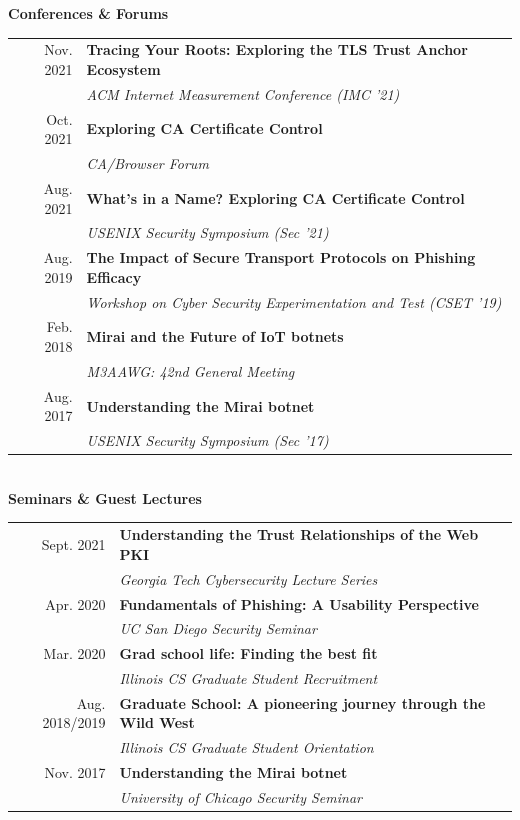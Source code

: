 \documentclass[10pt,singlecolumn]{article} %
\begin{document}
\textbf{Conferences \& Forums}\\

\begin{tabular}{rl}
Nov. 2021 & \textbf{Tracing Your Roots: Exploring the TLS Trust Anchor Ecosystem}\\
& \emph{ACM Internet Measurement Conference (IMC '21)} \\
Oct. 2021 & \textbf{Exploring CA Certificate Control}\\
& \emph{CA/Browser Forum} \\
Aug. 2021 & \textbf{What's in a Name? Exploring CA Certificate Control} \\
& \emph{USENIX Security Symposium (Sec '21)} \\
Aug. 2019 & \textbf{The Impact of Secure Transport Protocols on Phishing Efficacy} \\
& \emph{Workshop on Cyber Security Experimentation and Test (CSET '19)} \\
Feb. 2018 & \textbf{Mirai and the Future of IoT botnets}\\
& \emph{M3AAWG: 42nd General Meeting} \\ 
Aug. 2017 & \textbf{Understanding the Mirai botnet} \\
& \emph{USENIX Security Symposium (Sec '17)} \\ 
\end{tabular} \\

\vspace{0.3cm}
\textbf{Seminars \& Guest Lectures}\\

\begin{tabular}{rl}

Sept. 2021 & \textbf{Understanding the Trust Relationships of the Web PKI}\\
& \emph{Georgia Tech Cybersecurity Lecture Series}\\

Apr. 2020 & \textbf{Fundamentals of Phishing: A Usability Perspective}\\
& \emph{UC San Diego Security Seminar}\\

Mar. 2020 & \textbf{Grad school life: Finding the best fit}\\
& \emph{Illinois CS Graduate Student Recruitment}\\

Aug. 2018/2019 & \textbf{Graduate School: A pioneering journey through the Wild West}\\
& \emph{Illinois CS Graduate Student Orientation}\\

Nov. 2017 & \textbf{Understanding the Mirai botnet}\\
& \emph{University of Chicago Security Seminar}\\
\end{tabular} \\
\end{document}
